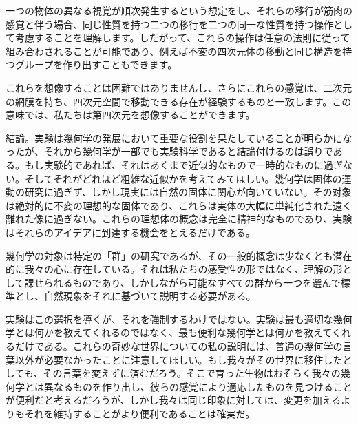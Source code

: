 \documentclass[a4paper,11pt,openany]{ltjsbook}
\begin{document}
一つの物体の異なる視覚が順次発生するという想定をし、それらの移行が筋肉の感覚と伴う場合、同じ性質を持つ二つの移行を二つの同一な性質を持つ操作として考慮することを理解します。したがって、これらの操作は任意の法則に従って組み合わされることが可能であり、例えば不変の四次元体の移動と同じ構造を持つグループを作り出すこともできます。

これらを想像することは困難ではありませんし、さらにこれらの感覚は、二次元の網膜を持ち、四次元空間で移動できる存在が経験するものと一致します。この意味では、私たちは第四次元を想像することができます。

結論。実験は幾何学の発展において重要な役割を果たしていることが明らかになったが、それから幾何学が一部でも実験科学であると結論付けるのは誤りである。もし実験的であれば、それはあくまで近似的なもので一時的なものに過ぎない。そしてそれがどれほど粗雑な近似かを考えてみてほしい。幾何学は固体の運動の研究に過ぎず、しかし現実には自然の固体に関心が向いていない。その対象は絶対的に不変の理想的な固体であり、これらは実体の大幅に単純化された遠く離れた像に過ぎない。これらの理想体の概念は完全に精神的なものであり、実験はそれらのアイデアに到達する機会をとえるだけである。

幾何学の対象は特定の「群」の研究であるが、その一般的概念は少なくとも潜在的に我々の心に存在している。それは私たちの感受性の形ではなく、理解の形として課せられるものであり、しかしながら可能なすべての群から一つを選んで標準とし、自然現象をそれに基づいて説明する必要がある。

実験はこの選択を導くが、それを強制するわけではない。実験は最も適切な幾何学とは何かを教えてくれるのではなく、最も便利な幾何学とは何かを教えてくれるだけである。これらの奇妙な世界についての私の説明には、普通の幾何学の言葉以外が必要なかったことに注意してほしい。もし我々がその世界に移住したとしても、その言葉を変えずに済むだろう。そこで育った生物はおそらく我々の幾何学とは異なるものを作り出し、彼らの感覚により適応したものを見つけることが便利だと考えるだろうが、しかし我々は同じ印象に対しては、変更を加えるよりもそれを維持することがより便利であることは確実だ。
\end{document}
